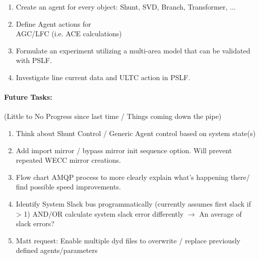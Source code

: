 \documentclass[12pt]{article}
\begin{document}
\begin{multicols}{2}
\begin{enumerate}
		\item Create an agent for every object: Shunt, SVD, Branch, Transformer, ...

		\item Define Agent actions for \\ AGC/LFC (i.e. ACE calculations)

		\item Formulate an experiment utilizing a multi-area model that can be validated with PSLF.

		\item Investigate line current data and ULTC action in PSLF.

		
		

	\end{enumerate}
\vfill\null
\columnbreak

\paragraph{Future Tasks:}(Little to No Progress since last time / Things coming down the pipe)
	\begin{enumerate}
		\item Think about Shunt Control / Generic Agent control based on system state(s)
		\item Add import mirror / bypass mirror init sequence option. Will prevent repeated WECC mirror creations.
		
		\item Flow chart AMQP process to more clearly explain what's happening there/ find possible speed improvements.

		\item Identify System Slack bus programmatically (currently assumes first slack if > 1)
		\subitem AND/OR calculate system slack error differently $\rightarrow$ An average of slack errors?

		\item Matt request: Enable multiple dyd files to overwrite / replace previously defined agents/parameters
		
		
	\end{enumerate}

\end{multicols}
\end{document}
